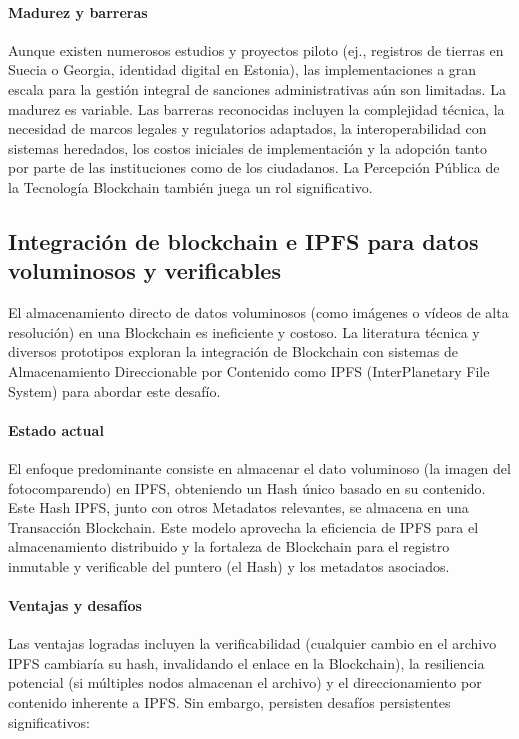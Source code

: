 \paragraph{Madurez y barreras}
Aunque existen numerosos estudios y proyectos piloto (ej., registros de tierras en Suecia o Georgia, identidad digital en Estonia), las implementaciones a gran escala para la gestión integral de sanciones administrativas aún son limitadas. La madurez es variable. Las barreras reconocidas incluyen la complejidad técnica, la necesidad de marcos legales y regulatorios adaptados, la interoperabilidad con sistemas heredados, los costos iniciales de implementación y la adopción tanto por parte de las instituciones como de los ciudadanos. La Percepción Pública de la Tecnología Blockchain también juega un rol significativo. 

\subsection{Integración de blockchain e IPFS para datos voluminosos y verificables} 

El almacenamiento directo de datos voluminosos (como imágenes o vídeos de alta resolución) en una Blockchain es ineficiente y costoso. La literatura técnica y diversos prototipos exploran la integración de Blockchain con sistemas de Almacenamiento Direccionable por Contenido como IPFS (InterPlanetary File System) para abordar este desafío. 

\paragraph{Estado actual} El enfoque predominante consiste en almacenar el dato voluminoso (la imagen del fotocomparendo) en IPFS, obteniendo un Hash único basado en su contenido. Este Hash IPFS, junto con otros Metadatos relevantes, se almacena en una Transacción Blockchain. Este modelo aprovecha la eficiencia de IPFS para el almacenamiento distribuido y la fortaleza de Blockchain para el registro inmutable y verificable del puntero (el Hash) y los metadatos asociados. 

\paragraph{Ventajas y desafíos} Las ventajas logradas incluyen la verificabilidad (cualquier cambio en el archivo IPFS cambiaría su hash, invalidando el enlace en la Blockchain), la resiliencia potencial (si múltiples nodos almacenan el archivo) y el direccionamiento por contenido inherente a IPFS. Sin embargo, persisten desafíos persistentes significativos: 


